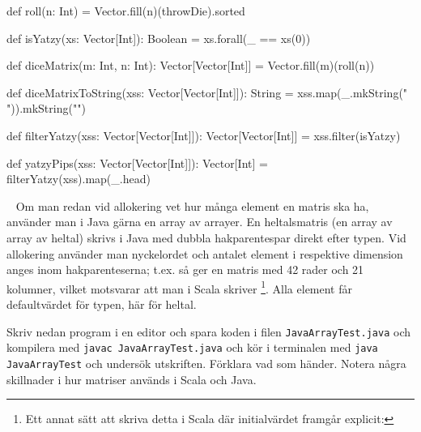 \SubtaskSolved  \begin{Code}
def roll(n: Int) = Vector.fill(n)(throwDie).sorted
\end{Code}

\SubtaskSolved  \begin{Code}
def isYatzy(xs: Vector[Int]): Boolean = xs.forall(_ == xs(0))
\end{Code}



\SubtaskSolved  \begin{Code}
def diceMatrix(m: Int, n: Int): Vector[Vector[Int]] =
  Vector.fill(m)(roll(n))
\end{Code}

\SubtaskSolved  \begin{Code}
def diceMatrixToString(xss: Vector[Vector[Int]]): String =
  xss.map(_.mkString(" ")).mkString("\n")
\end{Code}


\SubtaskSolved
\begin{Code}
def filterYatzy(xss: Vector[Vector[Int]]): Vector[Vector[Int]] =
  xss.filter(isYatzy)
\end{Code}



\SubtaskSolved  \begin{Code}
def yatzyPips(xss: Vector[Vector[Int]]): Vector[Int] =
  filterYatzy(xss).map(_.head)
\end{Code}

\QUESTEND





\QUESTBEGIN

\Task \label{task:arraymatrix-java} \what~   Om man redan vid allokering vet hur många element en matris ska ha, använder man i Java gärna en array av arrayer. En heltalsmatris (en array av array av heltal) skrivs i Java med dubbla hakparentespar  direkt efter typen. Vid allokering använder man nyckelordet  och antalet element i respektive dimension anges inom hakparenteserna; t.ex. så ger  en matris med 42 rader och 21 kolumner, vilket motsvarar att man i Scala skriver %
\footnote{
Ett annat sätt att skriva detta i Scala där initialvärdet framgår explicit: 
}. Alla element får defaultvärdet för typen, här  för heltal.

\Subtask Skriv nedan program i en editor och spara koden i filen \texttt{JavaArrayTest.java} och kompilera med \texttt{javac JavaArrayTest.java} och kör i terminalen med \texttt{java JavaArrayTest} och undersök utskriften. Förklara vad som händer. Notera några skillnader i hur matriser används i Scala och Java.


